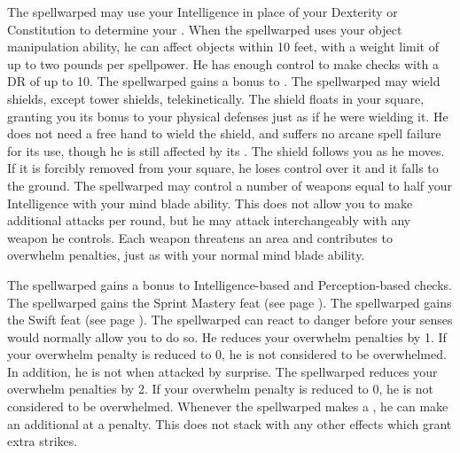        The spellwarped may use your Intelligence in place of your Dexterity or Constitution to determine your .
        When the spellwarped uses your object manipulation ability, he can affect objects within 10 feet, with a weight limit of up to two pounds per spellpower.
        He has enough control to make checks with a DR of up to 10.
        The spellwarped gains a  bonus to .
        The spellwarped may wield shields, except tower shields, telekinetically.
        The shield floats in your square, granting you its bonus to your physical defenses just as if he were wielding it.
        He does not need a free hand to wield the shield, and suffers no arcane spell failure for its use, though he is still affected by its .
        The shield follows you as he moves.
        If it is forcibly removed from your square, he loses control over it and it falls to the ground.
        The spellwarped may control a number of weapons equal to half your Intelligence with your mind blade ability.
        This does not allow you to make additional attacks per round, but he may attack interchangeably with any weapon he controls.
        Each weapon threatens an area and contributes to overwhelm penalties, just as with your normal mind blade ability.

        The spellwarped gains a  bonus to Intelligence-based and Perception-based checks.
        The spellwarped gains the Sprint Mastery feat (see page ).
        The spellwarped gains the Swift feat (see page ).
        The spellwarped can react to danger before your senses would normally allow you to do so.
        He reduces your overwhelm penalties by 1.
        If your overwhelm penalty is reduced to 0, he is not considered to be overwhelmed.
        In addition, he is not \unaware when attacked by surprise.
        The spellwarped reduces your overwhelm penalties by 2.
        If your overwhelm penalty is reduced to 0, he is not considered to be overwhelmed.
        Whenever the spellwarped makes a , he can make an additional  at a  penalty.
        This does not stack with any other effects which grant extra strikes.

